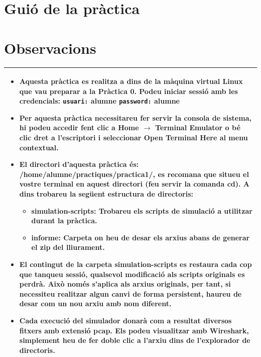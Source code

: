 \documentclass[12pt,a4paper]{article}
\begin{document}
\section{Guió de la pràctica}

\section*{Observacions}

 \begin{tabular}{||p{12cm}||}
 \hline\hline
 \begin{itemize}
 \item Aquesta pràctica es realitza a dins de la màquina virtual Linux que vau preparar a la Pràctica 0. Podeu iniciar sessió amb les credencials: 
   \newline \texttt{usuari:} \textbf{alumne}
   \newline \texttt{password:} \textbf{alumne}
 \item Per aquesta pràctica necessitareu fer servir la consola de sistema, hi podeu accedir fent clic a \textbf{Home} $\rightarrow$ \textbf{Terminal Emulator} o bé clic dret a l'escriptori i seleccionar \textbf{Open Terminal Here} al menu contextual.
 
 \item El directori d'aquesta pràctica és: \textbf{/home/alumne/practiques/practica1/}, es recomana que situeu el vostre terminal en aquest directori (feu servir la comanda \textbf{cd}). A dins trobareu la següent estructura de directoris:
    \begin{itemize}        
        \item\textbf{simulation-scripts}: Trobareu els scripts de simulació a utilitzar durant la pràctica.
        \item\textbf{informe}: Carpeta on heu de desar els arxius abans de generar el zip del lliurament.
    \end{itemize}
 
 \item El contingut de la carpeta \textbf{simulation-scripts} es restaura cada cop que tanqueu sessió, qualsevol modificació als scripts originals es perdrà. Això només s'aplica als arxius originals, per tant, si necessiteu realitzar algun canvi de forma persistent, haureu de desar com un nou arxiu amb nom diferent.
 
 \item Cada execució del simulador donarà com a resultat diversos fitxers amb extensió \textbf{pcap}. Els podeu visualitzar amb \textbf{Wireshark}, simplement heu de fer doble clic a l'arxiu dins de l'explorador de directoris.  
 \end{itemize}
 \\\hline\hline
 \end{tabular}
 \medskip
 
\end{document}
